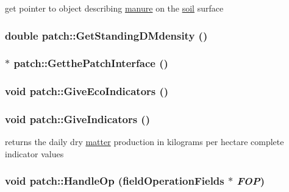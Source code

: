 get pointer to object describing \hyperlink{classmanure}{manure} on the \hyperlink{classsoil}{soil} surface \hypertarget{classpatch_ac2ef357347b2fe9682d93a6c9f4556ef}{
\subsubsection[{GetStandingDMdensity}]{\setlength{\rightskip}{0pt plus 5cm}double patch::GetStandingDMdensity ()}}
\label{classpatch_ac2ef357347b2fe9682d93a6c9f4556ef}
\hypertarget{classpatch_a537dde06dbfd967daf158975f4de51b4}{
\subsubsection[{GetthePatchInterface}]{$\ast$ patch::GetthePatchInterface ()}}
\label{classpatch_a537dde06dbfd967daf158975f4de51b4}
\hypertarget{classpatch_a11e6e3fe5733ec6ebd7b033f6cd69d9e}{
\subsubsection[{GiveEcoIndicators}]{\setlength{\rightskip}{0pt plus 5cm}void patch::GiveEcoIndicators ()}}
\label{classpatch_a11e6e3fe5733ec6ebd7b033f6cd69d9e}
\hypertarget{classpatch_a264e98a8bd59a3e2268e3edb8e440103}{
\subsubsection[{GiveIndicators}]{\setlength{\rightskip}{0pt plus 5cm}void patch::GiveIndicators ()}}
\label{classpatch_a264e98a8bd59a3e2268e3edb8e440103}
returns the daily dry \hyperlink{classmatter}{matter} production in kilograms per hectare complete indicator values \hypertarget{classpatch_ac47bef0c79638b0c203bbdc2ef2a0408}{
\subsubsection[{HandleOp}]{\setlength{\rightskip}{0pt plus 5cm}void patch::HandleOp ({\bf fieldOperationFields} $\ast$ {\em FOP})}}
\label{classpatch_ac47bef0c79638b0c203bbdc2ef2a0408}


